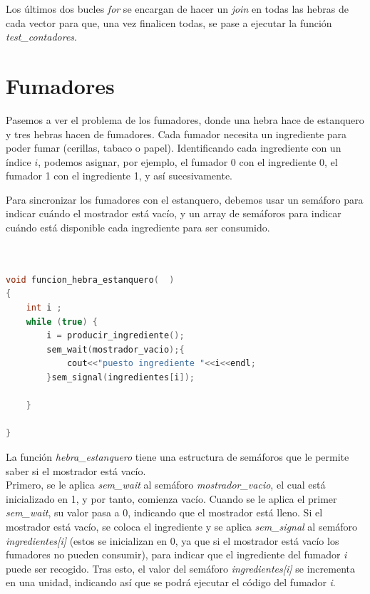 \documentclass{article}
\begin{document}
Los últimos dos bucles \textit{for} se encargan de hacer un \textit{join} en todas las hebras de cada vector para que, una vez finalicen todas, se pase a ejecutar la función \textit{test\_contadores}.

\section{Fumadores}
Pasemos a ver el problema de los fumadores, donde una hebra hace de estanquero y tres hebras hacen de fumadores. Cada fumador necesita un ingrediente para poder fumar (cerillas, tabaco o papel). Identificando cada ingrediente con un índice \(i\), podemos asignar, por ejemplo, el fumador 0 con el ingrediente 0, el fumador 1 con el ingrediente 1, y así sucesivamente.

Para sincronizar los fumadores con el estanquero, debemos usar un semáforo para indicar cuándo el mostrador está vacío, y un array de semáforos para indicar cuándo está disponible cada ingrediente para ser consumido.


\begin{lstlisting}[language=C++,caption=función hebra estanquero ] 


void funcion_hebra_estanquero(  )
{
	int i ;
	while (true) {
		i = producir_ingrediente();
		sem_wait(mostrador_vacio);{
			cout<<"puesto ingrediente "<<i<<endl;
		}sem_signal(ingredientes[i]);
	
	}

}
\end{lstlisting}
La función \textit{hebra\_estanquero} tiene una estructura de semáforos que le permite saber si el mostrador está vacío. \\
Primero, se le aplica \textit{sem\_wait} al semáforo \textit{mostrador\_vacio}, el cual está inicializado en 1, y por tanto, comienza vacío. Cuando se le aplica el primer \textit{sem\_wait}, su valor pasa a 0, indicando que el mostrador está lleno. Si el mostrador está vacío, se coloca el ingrediente y se aplica \textit{sem\_signal} al semáforo \textit{ingredientes[i]} (estos se inicializan en 0, ya que si el mostrador está vacío los fumadores no pueden consumir), para indicar que el ingrediente del fumador \textit{i} puede ser recogido. Tras esto, el valor del semáforo \textit{ingredientes[i]} se incrementa en una unidad, indicando así que se podrá ejecutar el código del fumador \textit{i}.
\end{document}
